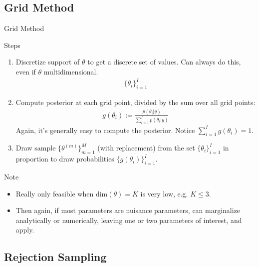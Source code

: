 \documentclass[aspectratio=169, handout]{beamer}
\begin{document}
\subsection{Grid Method}

{\footnotesize
\begin{frame}{Grid Method}

Steps
\begin{enumerate}
  \item
    Discretize support of $\theta$ to get a discrete set of values.
    Can always do this, even if $\theta$ multidimensional.
    \begin{align*}
      \{\theta_{i}\}_{i=1}^I
    \end{align*}

  \item
    Compute posterior at each grid point, divided by the sum
    over all grid points:
    \begin{align*}
      g(\theta_{i})
      :=
      \frac{p(\theta_{i}|y)}{\sum_{i=1}^Ip(\theta_{i}|y)}
    \end{align*}
    Again, it's generally easy to \alert{compute} the posterior.
    Notice $\sum_{i=1}^I g(\theta_i)=1$.

  \item
    Draw sample $\{\theta^{(m)}\}_{m=1}^M$ (with replacement) from
    the set $\{\theta_{i}\}_{i=1}^I$ in proportion to draw
    probabilities $\{g(\theta_{i})\}_{i=1}^I$.
\end{enumerate}
\vspace{-8pt}
Note
\vspace{-8pt}
\begin{itemize}
  \item
    Really only feasible when $\text{dim}(\theta)=K$ is very low,
    e.g. $K\leq 3$.
  \item Then again, if most parameters are nuisance parameters, can
    marginalize analytically or numerically, leaving one or two
    parameters of interest, and apply.
\end{itemize}
\end{frame}
}


\subsection{Rejection Sampling}
\end{document}
